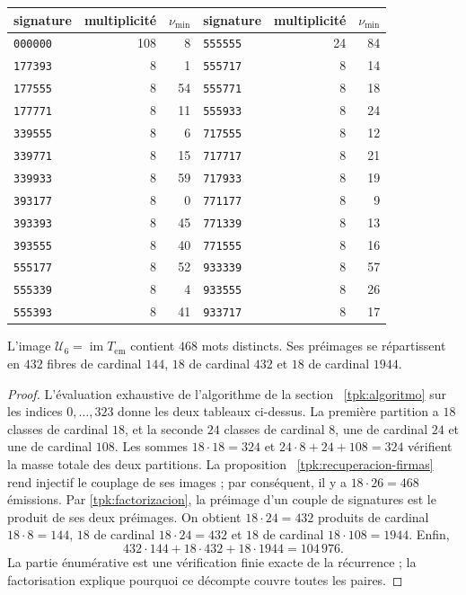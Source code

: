 \begin{tablacompleta}[htbp]
\caption{Les vingt-six signatures multiplicatives.}
\label{tpk:firmas-multiplicativas}
\begin{tabular}{@{}lrr@{\qquad}lrr@{}}
\toprule
signature&multiplicité&\(\nu_{\min}\)&signature&multiplicité&\(\nu_{\min}\)\\
\midrule
\texttt{000000}&108&8&\texttt{555555}&24&84\\
\texttt{177393}&8&1&\texttt{555717}&8&14\\
\texttt{177555}&8&54&\texttt{555771}&8&18\\
\texttt{177771}&8&11&\texttt{555933}&8&24\\
\texttt{339555}&8&6&\texttt{717555}&8&12\\
\texttt{339771}&8&15&\texttt{717717}&8&21\\
\texttt{339933}&8&59&\texttt{717933}&8&19\\
\texttt{393177}&8&0&\texttt{771177}&8&9\\
\texttt{393393}&8&45&\texttt{771339}&8&13\\
\texttt{393555}&8&40&\texttt{771555}&8&16\\
\texttt{555177}&8&52&\texttt{933339}&8&57\\
\texttt{555339}&8&4&\texttt{933555}&8&26\\
\texttt{555393}&8&41&\texttt{933717}&8&17\\
\bottomrule
\end{tabular}
\end{tablacompleta}

\begin{proposicion}
\label{tpk:468}
L'image \(\mathcal U_6=\operatorname{im}T_{\mathrm{em}}\) contient
\(468\) mots distincts. Ses préimages se répartissent en \(432\)
fibres de cardinal \(144\), \(18\) de cardinal \(432\) et \(18\) de
cardinal \(1944\).
\end{proposicion}
\begin{proof}
L'évaluation exhaustive de l'algorithme de la section ~\ref{tpk:algoritmo} sur les indices \(0,\ldots,323\) donne les deux tableaux ci-dessus. La première partition a \(18\) classes de cardinal \(18\), et la seconde \(24\) classes de cardinal \(8\), une de cardinal \(24\) et une de cardinal \(108\). Les sommes \(18\cdot18=324\) et \(24\cdot8+24+108=324\) vérifient la masse totale des deux partitions. La proposition ~\ref{tpk:recuperacion-firmas} rend injectif le couplage de ses images ; par conséquent, il y a \(18\cdot26=468\) émissions. Par \eqref{tpk:factorizacion}, la préimage d'un couple de signatures est le produit de ses deux préimages. On obtient \(18\cdot24=432\) produits de cardinal \(18\cdot8=144\), \(18\) de cardinal \(18\cdot24=432\) et \(18\) de cardinal \(18\cdot108=1944\). Enfin,
\[
 432\cdot144+18\cdot432+18\cdot1944=104\,976.
\]
La partie énumérative est une vérification finie exacte de la récurrence ;
la factorisation explique pourquoi ce décompte couvre toutes les paires.
\end{proof}

